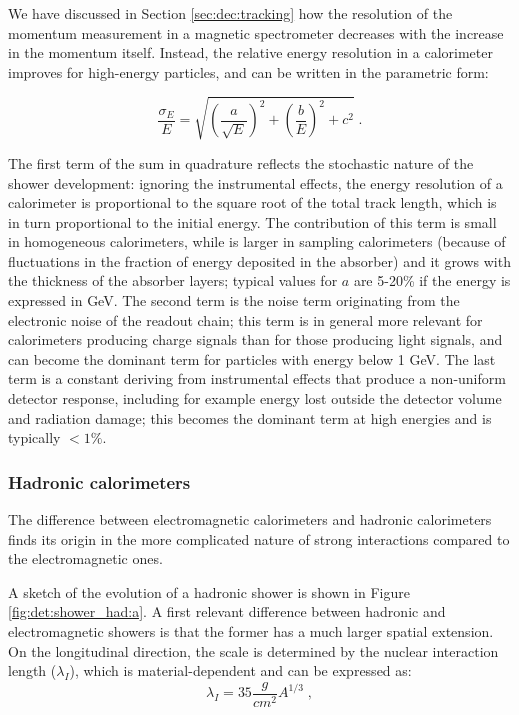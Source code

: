 We have discussed in Section \ref{sec:dec:tracking} how the resolution of the momentum measurement in a magnetic spectrometer decreases with the increase in the momentum itself. Instead, the relative energy resolution in a calorimeter improves for high-energy particles, and can be written in the parametric form:

\begin{equation}
\frac{\sigma_E}{E} = \sqrt{\left(\frac{a}{\sqrt{E}} \right)^2 + \left( \frac{b}{E} \right)^2 + c^2 } \; . \nonumber
\end{equation}

\noindent The first term of the sum in quadrature reflects the stochastic nature of the shower development: ignoring the instrumental effects, the energy resolution of a calorimeter is proportional to the square root of the total track length, which is in turn proportional to the initial energy. The contribution of this term is small in homogeneous calorimeters, while is larger in sampling calorimeters (because of fluctuations in the fraction of energy deposited in the absorber) and it grows with the thickness of the absorber layers; typical values for $a$ are 5-20\% if the energy is expressed in GeV. The second term is the noise term originating from the electronic noise of the readout chain; this term is in general more relevant for calorimeters producing charge signals than for those producing light signals, and can become the dominant term for particles with energy below 1 GeV. The last term is a constant deriving from instrumental effects that produce a non-uniform detector response, including for example energy lost outside the detector volume and radiation damage; this becomes the dominant term at high energies and is typically $<1\%$. 



\subsubsection*{Hadronic calorimeters}

The difference between electromagnetic calorimeters and hadronic calorimeters finds its origin in the more complicated nature of strong interactions compared to the electromagnetic ones. 

A sketch of the evolution of a hadronic shower is shown in Figure \ref{fig:det:shower_had:a}. A first relevant difference between hadronic and electromagnetic showers is that the former has a much larger spatial extension. On the longitudinal direction, the scale is determined by the nuclear interaction length ($\lambda_I$), which is material-dependent and can be expressed as:
\begin{equation}
\lambda_I = 35 \frac{g}{cm^2} A^{1/3} \; , \nonumber
\end{equation}

